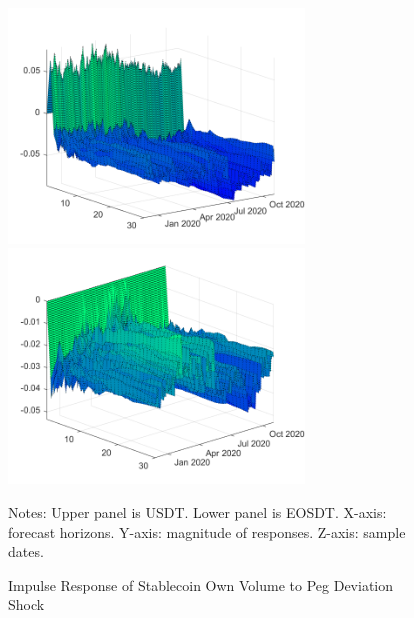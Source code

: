 \documentclass[12pt]{article}
\begin{document}
\begin{figure}
	\centering
	\caption{Impulse Response of Stablecoin Own Volume to Peg Deviation Shock}
	\includegraphics[width=0.7\textwidth]{shock3resp4cum}
	\includegraphics[width=0.7\textwidth]{shock3resp4cumeos}
	\label{shock34}
	\begin{minipage}{1\textwidth} 
		{\footnotesize Notes: Upper panel is USDT. Lower panel is EOSDT. X-axis: forecast horizons. Y-axis: magnitude of responses. Z-axis: sample dates. \par}
	\end{minipage}
\end{figure}


\clearpage
\singlespacing





\clearpage

\onehalfspacing
\end{document}
